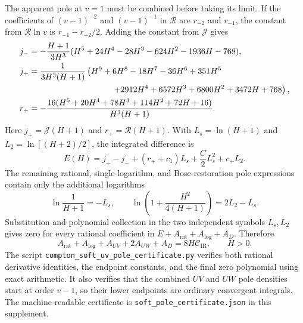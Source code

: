 The apparent pole at $v=1$ must be combined before taking its limit.
If the coefficients of $(v-1)^{-2}$ and $(v-1)^{-1}$ in $\mathcal R$
are $r_{-2}$ and $r_{-1}$, the constant from
$\mathcal R\ln v$ is $r_{-1}-r_{-2}/2$.  Adding the constant from
$\mathcal J$ gives
\begin{align}
 j_-&=-\frac{H+1}{3H^3}
       (H^5+24H^4-28H^3-624H^2-1936H-768),\\
 j_+&=\frac{1}{3H^3(H+1)}
 \left(H^9+6H^8-18H^7-36H^6+351H^5\right.\\
 &\hspace{35mm}\left.+2912H^4+6572H^3+6800H^2+3472H+768\right),\\
 r_+&=-\frac{16(H^5+20H^4+78H^3+114H^2+72H+16)}{H^3(H+1)}.
\end{align}
Here $j_+=\mathcal J(H+1)$ and $r_+=\mathcal R(H+1)$.
With $L_s=\ln(H+1)$ and $L_2=\ln[(H+2)/2]$, the integrated difference is
\begin{equation}
 E(H)=j_+-j_-+(r_++c_1)L_s+\frac C2L_s^2+c_+L_2.
\end{equation}
The remaining rational, single-logarithm, and Bose-restoration pole
expressions contain only the additional logarithms
\begin{equation}
 \ln\frac1{H+1}=-L_s,\qquad
 \ln\left(1+\frac{H^2}{4(H+1)}\right)=2L_2-L_s.
\end{equation}
Substitution and polynomial collection in the two independent symbols
$L_s,L_2$ gives zero for every rational coefficient in
$E+A_{\mathrm{rat}}+A_{\log}+A_D$.  Therefore
\begin{equation}
 A_{\mathrm{rat}}+A_{\log}+A_{UV}+2A_{UW}+A_D
              =8H\mathcal C_{\mathrm{IR}},\qquad H>0.
\end{equation}
The script \nolinkurl{compton_soft_uv_pole_certificate.py} verifies both
rational derivative identities, the endpoint constants, and the final
zero polynomial using exact arithmetic.  It also verifies that the
combined $UV$ and $UW$ pole densities start at order $v-1$, so their
lower endpoints are ordinary convergent integrals.  The machine-readable
certificate is \nolinkurl{soft_pole_certificate.json} in this supplement.
